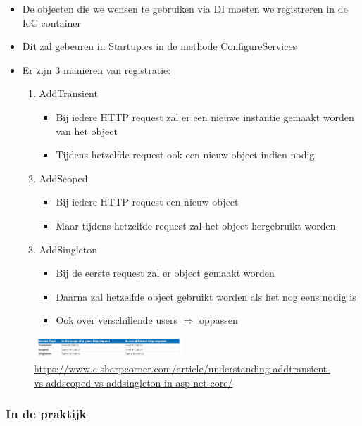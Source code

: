 \documentclass{article}
\begin{document}
\begin{itemize}
    \item De objecten die we wensen te gebruiken via DI moeten we registreren in de IoC container
    \item Dit zal gebeuren in Startup.cs in de methode ConfigureServices
    \item Er zijn 3 manieren van registratie:
    \begin{enumerate}
        \item AddTransient
        \begin{itemize}
            \item Bij iedere HTTP request zal er een nieuwe instantie gemaakt worden van het object
            \item Tijdens hetzelfde request ook een nieuw object indien nodig
        \end{itemize}
        \item AddScoped
        \begin{itemize}
            \item Bij iedere HTTP request een nieuw object
            \item Maar tijdens hetzelfde request zal het object hergebruikt worden
        \end{itemize}
        \item AddSingleton
        \begin{itemize}
            \item Bij de eerste request zal er object gemaakt worden
            \item Daarna zal hetzelfde object gebruikt worden als het nog eens nodig is
            \item Ook over verschillende users $\Rightarrow$ oppassen
        \end{itemize}
    \end{enumerate}
\end{itemize}


\begin{figure}[H]
    \centering
    \includegraphics[width=0.5\textwidth]{dependency-injection-registratie.png}
    \caption{\url{https://www.c-sharpcorner.com/article/understanding-addtransient-vs-addscoped-vs-addsingleton-in-asp-net-core/}}
\end{figure}

\subsubsection{In de praktijk}
\end{document}
